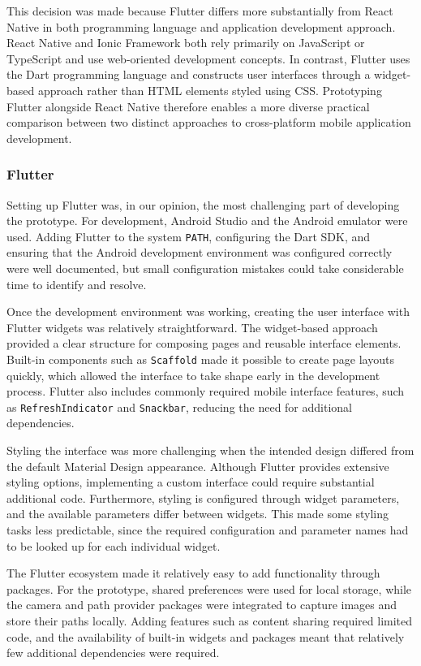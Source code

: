 This decision was made because Flutter differs more substantially from React Native in both programming language and application development approach.
React Native and Ionic Framework both rely primarily on JavaScript or TypeScript and use web-oriented development concepts.
In contrast, Flutter uses the Dart programming language and constructs user interfaces through a widget-based approach rather than HTML elements styled using CSS.
Prototyping Flutter alongside React Native therefore enables a more diverse practical comparison between two distinct approaches to cross-platform mobile application development.

\subsubsection{Flutter}
Setting up Flutter was, in our opinion, the most challenging part of developing the prototype.
For development, Android Studio and the Android emulator were used.
Adding Flutter to the system \texttt{PATH}, configuring the Dart SDK, and ensuring that the Android development environment was configured correctly were well documented, but small configuration mistakes could take considerable time to identify and resolve.

Once the development environment was working, creating the user interface with Flutter widgets was relatively straightforward.
The widget-based approach provided a clear structure for composing pages and reusable interface elements.
Built-in components such as \texttt{Scaffold} made it possible to create page layouts quickly, which allowed the interface to take shape early in the development process.
Flutter also includes commonly required mobile interface features, such as \texttt{RefreshIndicator} and \texttt{Snackbar}, reducing the need for additional dependencies.

Styling the interface was more challenging when the intended design differed from the default Material Design appearance.
Although Flutter provides extensive styling options, implementing a custom interface could require substantial additional code.
Furthermore, styling is configured through widget parameters, and the available parameters differ between widgets.
This made some styling tasks less predictable, since the required configuration and parameter names had to be looked up for each individual widget.

The Flutter ecosystem made it relatively easy to add functionality through packages.
For the prototype, shared preferences were used for local storage, while the camera and path provider packages were integrated to capture images and store their paths locally.
Adding features such as content sharing required limited code, and the availability of built-in widgets and packages meant that relatively few additional dependencies were required.

